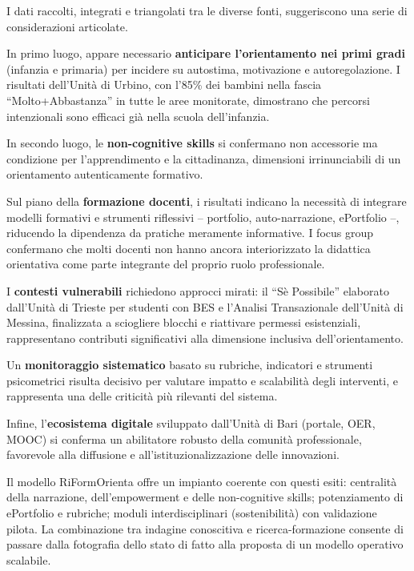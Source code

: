 \documentclass[12pt,a4paper]{article}
\begin{document}
I dati raccolti, integrati e triangolati tra le diverse fonti, suggeriscono una serie di considerazioni articolate.

In primo luogo, appare necessario \textbf{anticipare l'orientamento nei primi gradi} (infanzia e primaria) per incidere su autostima, motivazione e autoregolazione. I risultati dell'Unit\`a di Urbino, con l'85\% dei bambini nella fascia ``Molto+Abbastanza'' in tutte le aree monitorate, dimostrano che percorsi intenzionali sono efficaci gi\`a nella scuola dell'infanzia.

In secondo luogo, le \textbf{non-cognitive skills} si confermano non accessorie ma condizione per l'apprendimento e la cittadinanza, dimensioni irrinunciabili di un orientamento autenticamente formativo.

Sul piano della \textbf{formazione docenti}, i risultati indicano la necessit\`a di integrare modelli formativi e strumenti riflessivi -- portfolio, auto-narrazione, ePortfolio --, riducendo la dipendenza da pratiche meramente informative. I focus group confermano che molti docenti non hanno ancora interiorizzato la didattica orientativa come parte integrante del proprio ruolo professionale.

I \textbf{contesti vulnerabili} richiedono approcci mirati: il ``S\`e Possibile'' elaborato dall'Unit\`a di Trieste per studenti con BES e l'Analisi Transazionale dell'Unit\`a di Messina, finalizzata a sciogliere blocchi e riattivare permessi esistenziali, rappresentano contributi significativi alla dimensione inclusiva dell'orientamento.

Un \textbf{monitoraggio sistematico} basato su rubriche, indicatori e strumenti psicometrici risulta decisivo per valutare impatto e scalabilit\`a degli interventi, e rappresenta una delle criticit\`a pi\`u rilevanti del sistema.

Infine, l'\textbf{ecosistema digitale} sviluppato dall'Unit\`a di Bari (portale, OER, MOOC) si conferma un abilitatore robusto della comunit\`a professionale, favorevole alla diffusione e all'istituzionalizzazione delle innovazioni.

Il modello RiFormOrienta offre un impianto coerente con questi esiti: centralit\`a della narrazione, dell'empowerment e delle non-cognitive skills; potenziamento di ePortfolio e rubriche; moduli interdisciplinari (sostenibilit\`a) con validazione pilota. La combinazione tra indagine conoscitiva e ricerca-formazione consente di passare dalla fotografia dello stato di fatto alla proposta di un modello operativo scalabile.
\end{document}
